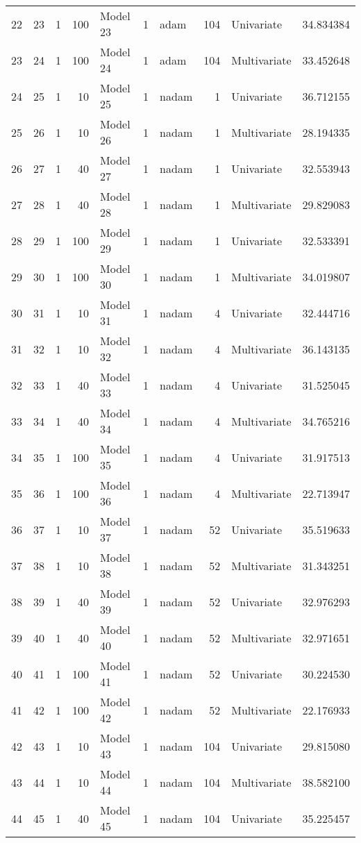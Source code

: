 \begin{tabular}{lrrrlrlrlr}
22 & 23 & 1 & 100 & Model 23 & 1 & adam & 104 & Univariate & 34.834384 \\
23 & 24 & 1 & 100 & Model 24 & 1 & adam & 104 & Multivariate & 33.452648 \\
24 & 25 & 1 & 10 & Model 25 & 1 & nadam & 1 & Univariate & 36.712155 \\
25 & 26 & 1 & 10 & Model 26 & 1 & nadam & 1 & Multivariate & 28.194335 \\
26 & 27 & 1 & 40 & Model 27 & 1 & nadam & 1 & Univariate & 32.553943 \\
27 & 28 & 1 & 40 & Model 28 & 1 & nadam & 1 & Multivariate & 29.829083 \\
28 & 29 & 1 & 100 & Model 29 & 1 & nadam & 1 & Univariate & 32.533391 \\
29 & 30 & 1 & 100 & Model 30 & 1 & nadam & 1 & Multivariate & 34.019807 \\
30 & 31 & 1 & 10 & Model 31 & 1 & nadam & 4 & Univariate & 32.444716 \\
31 & 32 & 1 & 10 & Model 32 & 1 & nadam & 4 & Multivariate & 36.143135 \\
32 & 33 & 1 & 40 & Model 33 & 1 & nadam & 4 & Univariate & 31.525045 \\
33 & 34 & 1 & 40 & Model 34 & 1 & nadam & 4 & Multivariate & 34.765216 \\
34 & 35 & 1 & 100 & Model 35 & 1 & nadam & 4 & Univariate & 31.917513 \\
35 & 36 & 1 & 100 & Model 36 & 1 & nadam & 4 & Multivariate & 22.713947 \\
36 & 37 & 1 & 10 & Model 37 & 1 & nadam & 52 & Univariate & 35.519633 \\
37 & 38 & 1 & 10 & Model 38 & 1 & nadam & 52 & Multivariate & 31.343251 \\
38 & 39 & 1 & 40 & Model 39 & 1 & nadam & 52 & Univariate & 32.976293 \\
39 & 40 & 1 & 40 & Model 40 & 1 & nadam & 52 & Multivariate & 32.971651 \\
40 & 41 & 1 & 100 & Model 41 & 1 & nadam & 52 & Univariate & 30.224530 \\
41 & 42 & 1 & 100 & Model 42 & 1 & nadam & 52 & Multivariate & 22.176933 \\
42 & 43 & 1 & 10 & Model 43 & 1 & nadam & 104 & Univariate & 29.815080 \\
43 & 44 & 1 & 10 & Model 44 & 1 & nadam & 104 & Multivariate & 38.582100 \\
44 & 45 & 1 & 40 & Model 45 & 1 & nadam & 104 & Univariate & 35.225457 \\

\end{tabular}
